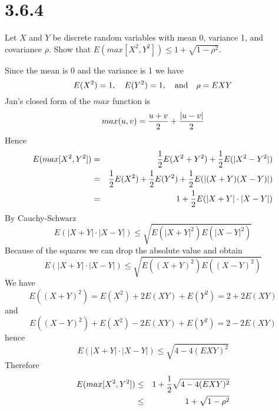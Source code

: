 \section*{3.6.4}
Let $X$ and $Y$ be discrete random variables with mean 0,
variance 1, and covariance $\rho$.
Show that $E(max[X^2,Y^2])\le1+\sqrt{1-\rho^2}$.

\bigskip
\noindent
Since the mean is 0 and the variance is 1 we have
$$E(X^2)=1,\quad E(Y^2)=1,\quad\hbox{and}\quad\rho=EXY$$
Jan's closed form of the $max$ function is
$$max(u,v)={u+v\over2}+{|u-v|\over2}$$
Hence
\begin{eqnarray*}
E(max[X^2,Y^2])&=&{1\over2}E(X^2+Y^2)
+{1\over2}E(|X^2-Y^2|)\\
&=&{1\over2}E(X^2)+{1\over2}E(Y^2)+{1\over2}E(|(X+Y)(X-Y)|)\\
&=&1+{1\over2}E(|X+Y|\cdot|X-Y|)
\end{eqnarray*}
By Cauchy-Schwarz
$$E(|X+Y|\cdot|X-Y|)\le\sqrt{E(|X+Y|^2)E(|X-Y|^2)}$$
Because of the squares we can drop the absolute value and obtain
$$E(|X+Y|\cdot|X-Y|)\le\sqrt{E((X+Y)^2)E((X-Y)^2)}$$
We have
$$E((X+Y)^2)=E(X^2)+2E(XY)+E(Y^2)=2+2E(XY)$$
and
$$E((X-Y)^2)+E(X^2)-2E(XY)+E(Y^2)=2-2E(XY)$$
hence
$$E(|X+Y|\cdot|X-Y|)\le\sqrt{4-4(EXY)^2}$$
Therefore
\begin{eqnarray*}
E(max[X^2,Y^2])&\le&
1+{1\over2}\sqrt{4-4(EXY)^2}\\
&\le&1+\sqrt{1-\rho^2}
\end{eqnarray*}

